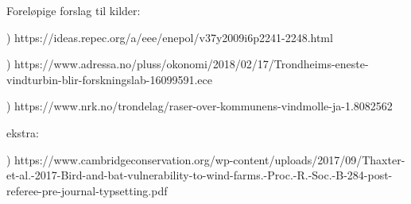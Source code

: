 Foreløpige forslag til kilder:

) https://ideas.repec.org/a/eee/enepol/v37y2009i6p2241-2248.html

) https://www.adressa.no/pluss/okonomi/2018/02/17/Trondheims-eneste-vindturbin-blir-forskningslab-16099591.ece

) https://www.nrk.no/trondelag/raser-over-kommunens-vindmolle-ja-1.8082562

ekstra:

) https://www.cambridgeconservation.org/wp-content/uploads/2017/09/Thaxter-et-al.-2017-Bird-and-bat-vulnerability-to-wind-farms.-Proc.-R.-Soc.-B-284-post-referee-pre-journal-typsetting.pdf